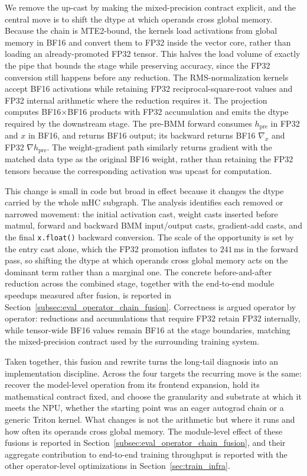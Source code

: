 We remove the up-cast by making the mixed-precision contract explicit, and the central move is to shift the dtype at which operands cross global memory. Because the chain is MTE2-bound, the kernels load activations from global memory in BF16 and convert them to FP32 inside the vector core, rather than loading an already-promoted FP32 tensor. This halves the load volume of exactly the pipe that bounds the stage while preserving accuracy, since the FP32 conversion still happens before any reduction. The RMS-normalization kernels accept BF16 activations while retaining FP32 reciprocal-square-root values and FP32 internal arithmetic where the reduction requires it. The projection computes BF16$\times$BF16 products with FP32 accumulation and emits the dtype required by the downstream stage. The pre-BMM forward consumes $h_{\mathrm{pre}}$ in FP32 and $x$ in BF16, and returns BF16 output; its backward returns BF16 $\nabla_x$ and FP32 $\nabla h_{\mathrm{pre}}$. The weight-gradient path similarly returns  gradient with the matched data type as the original BF16 weight, rather than retaining the FP32 tensors because the corresponding activation was upcast for computation.

This change is small in code but broad in effect because it changes the dtype carried by the whole mHC subgraph. The analysis identifies each removed or narrowed movement: the initial activation cast, weight casts inserted before matmul, forward and backward BMM input/output casts, gradient-add casts, and the final \texttt{x.float()} backward conversion. The scale of the opportunity is set by the entry cast alone, which the FP32 promotion inflates to $241$\,ms in the forward pass, so shifting the dtype at which operands cross global memory acts on the dominant term rather than a marginal one. The concrete before-and-after reduction across the combined stage, together with the end-to-end module speedups measured after fusion, is reported in Section~\ref{subsec:eval_operator_chain_fusion}. Correctness is argued operator by operator: reductions and accumulations that require FP32 retain FP32 internally, while tensor-wide BF16 values remain BF16 at the stage boundaries, matching the mixed-precision contract used by the surrounding training system.

Taken together, this fusion and rewrite turns the long-tail diagnosis into an implementation discipline. Across the four targets the recurring move is the same: recover the model-level operation from its frontend expansion, hold its mathematical contract fixed, and choose the granularity and substrate at which it meets the NPU, whether the starting point was an eager autograd chain or a generic Triton kernel. What changes is not the arithmetic but where it runs and how often its operands cross global memory. The module-level effect of these fusions is reported in Section~\ref{subsec:eval_operator_chain_fusion}, and their aggregate contribution to end-to-end training throughput is reported with the other operator-level optimizations in Section~\ref{sec:train_infra}.



